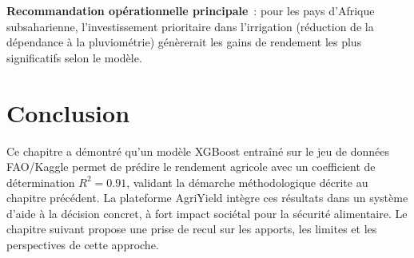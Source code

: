 \textbf{Recommandation opérationnelle principale}~: pour les pays d'Afrique subsaharienne, l'investissement prioritaire dans l'irrigation (réduction de la dépendance à la pluviométrie) génèrerait les gains de rendement les plus significatifs selon le modèle.

\section{Conclusion}

Ce chapitre a démontré qu'un modèle XGBoost entraîné sur le jeu de données FAO/Kaggle permet de prédire le rendement agricole avec un coefficient de détermination $R^2 = 0.91$, validant la démarche méthodologique décrite au chapitre précédent. La plateforme AgriYield intègre ces résultats dans un système d'aide à la décision concret, à fort impact sociétal pour la sécurité alimentaire. Le chapitre suivant propose une prise de recul sur les apports, les limites et les perspectives de cette approche.

\newpage
